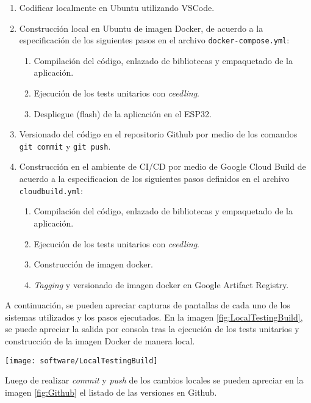 \begin{enumerate}
	\item Codificar localmente en Ubuntu utilizando VSCode.
	\item Construcción local en Ubuntu de imagen Docker, de acuerdo a la especificación de los siguientes pasos en el archivo \verb|docker-compose.yml|:
	\begin{enumerate}
		\item Compilación del código, enlazado de bibliotecas y empaquetado de la aplicación.
		\item Ejecución de los tests unitarios con \textit{ceedling}.
		\item Despliegue (flash) de la aplicación en el ESP32.
	\end{enumerate}
	\item Versionado del código en el repositorio Github por medio de los comandos \verb|git commit| y \verb|git push|.
	\item Construcción en el ambiente de CI/CD por medio de Google Cloud Build de acuerdo a la especificacion de los siguientes pasos definidos en el archivo \verb|cloudbuild.yml|:
	\begin{enumerate}
		\item Compilación del código, enlazado de bibliotecas y empaquetado de la aplicación.
		\item Ejecución de los tests unitarios con \textit{ceedling}.
		\item Construcción de imagen docker.
		\item \textit{Tagging} y versionado de imagen docker en Google Artifact Registry.
	\end{enumerate}
\end{enumerate}


A continuación, se pueden apreciar capturas de pantallas de cada uno de los sistemas utilizados y los pasos ejecutados. En la imagen \ref{fig:LocalTestingBuild}, se puede apreciar la salida por consola tras la ejecución de los tests unitarios y construcción de la imagen Docker de manera local. 



\begin{center}
   \texttt{[image: software/LocalTestingBuild]}
   \label{fig:LocalTestingBuild}
\end{center}


Luego de realizar \textit{commit} y \textit{push} de los cambios locales se pueden apreciar en la imagen \ref{fig:Github} el listado de las versiones en Github.



